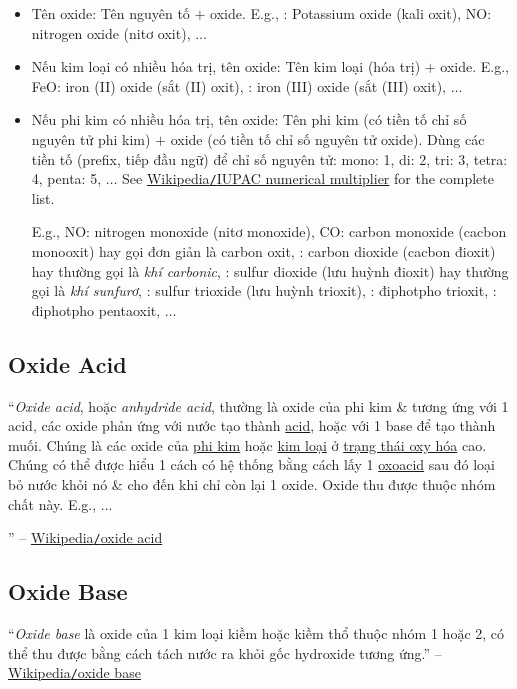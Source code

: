 \documentclass{article}
\begin{document}
\begin{itemize}
	\item Tên oxide: Tên nguyên tố $+$ oxide. E.g., : Potassium oxide (kali oxit), NO: nitrogen oxide (nitơ oxit), $\ldots$
	\item Nếu kim loại có nhiều hóa trị, tên oxide: Tên kim loại (hóa trị) $+$ oxide. E.g., FeO: iron (II) oxide (sắt (II) oxit), : iron (III) oxide (sắt (III) oxit), $\ldots$
	\item Nếu phi kim có nhiều hóa trị, tên oxide: Tên phi kim (có tiền tố chỉ số nguyên tử phi kim) $+$ oxide (có tiền tố chỉ số nguyên tử oxide). Dùng các tiền tố (prefix, tiếp đầu ngữ) để chỉ số nguyên tử: mono: 1, di: 2, tri: 3, tetra: 4, penta: 5, $\ldots$ See \href{https://en.wikipedia.org/wiki/IUPAC_numerical_multiplier}{Wikipedia{\tt/}IUPAC numerical multiplier} for the complete list.
	
	E.g., NO: nitrogen monoxide (nitơ monoxide), CO: carbon monoxide (cacbon monooxit) hay gọi đơn giản là carbon oxit, : carbon dioxide (cacbon đioxit) hay thường gọi là \textit{khí carbonic}, : sulfur dioxide (lưu huỳnh đioxit) hay thường gọi là \textit{khí sunfurơ}, : sulfur trioxide (lưu huỳnh trioxit), : điphotpho trioxit, : điphotpho pentaoxit, $\ldots$
\end{itemize}

\subsection{Oxide Acid}
``\textit{Oxide acid}, hoặc \textit{anhydride acid}, thường là oxide của phi kim \& tương ứng với 1 acid, các oxide phản ứng với nước tạo thành \href{https://vi.wikipedia.org/wiki/Acid}{acid}, hoặc với 1 base để tạo thành muối. Chúng là các oxide của \href{https://vi.wikipedia.org/wiki/Phi_kim}{phi kim} hoặc \href{https://vi.wikipedia.org/wiki/Kim_lo%E1%BA%A1i}{kim loại} ở \href{https://vi.wikipedia.org/wiki/Tr%E1%BA%A1ng_th%C3%A1i_oxy_h%C3%B3a}{trạng thái oxy hóa} cao. Chúng có thể được hiểu 1 cách có hệ thống bằng cách lấy 1 \href{https://vi.wikipedia.org/wiki/Acid_oxo}{oxoacid} sau đó loại bỏ nước khỏi nó \& cho đến khi chỉ còn lại 1 oxide. Oxide thu được thuộc nhóm chất này. E.g., ...

'' -- \href{https://vi.wikipedia.org/wiki/Oxide_acid}{Wikipedia{\tt/}oxide acid}

\subsection{Oxide Base}
``\textit{Oxide base} là oxide của 1 kim loại kiềm hoặc kiềm thổ thuộc nhóm 1 hoặc 2, có thể thu được bằng cách tách nước ra khỏi gốc hydroxide tương ứng.'' -- \href{https://vi.wikipedia.org/wiki/Oxide_base}{Wikipedia{\tt/}oxide base}
\end{document}
